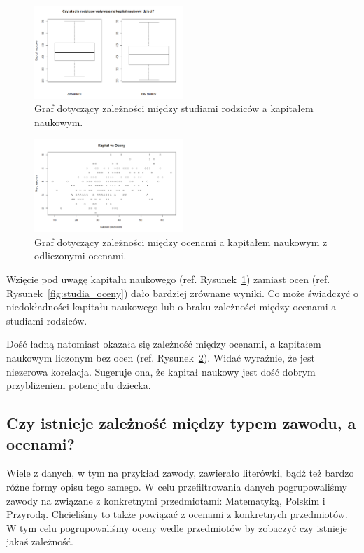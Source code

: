 \documentclass[conference]{IEEEtran}
\begin{document}
\begin{figure}
	\centering
	\includegraphics[width=0.5\textwidth]{6.png}
	\caption{Graf dotyczący zależności między studiami rodziców a kapitałem naukowym.}
	\label{fig:studia_kapital}
\end{figure}
\begin{figure}
	\centering
	\includegraphics[width=0.5\textwidth]{7.png}
	\caption{Graf dotyczący zależności między ocenami a kapitałem naukowym z odliczonymi ocenami.}
	\label{fig:oceny_kapital}
\end{figure}

Wzięcie pod uwagę kapitału naukowego (ref. Rysunek~\ref{fig:studia_kapital}) zamiast ocen (ref. Rysunek~\ref{fig:studia_oceny}) dało bardziej zrównane wyniki. Co może świadczyć o niedokładności kapitału naukowego lub o braku zależności między ocenami a studiami rodziców.

Dość ładną natomiast okazała się zależność między ocenami, a kapitałem naukowym liczonym bez ocen (ref. Rysunek~\ref{fig:oceny_kapital}). Widać wyraźnie, że jest niezerowa korelacja. Sugeruje ona, że kapitał naukowy jest dość dobrym przybliżeniem potencjału dziecka.

\subsection{Czy istnieje zależność między typem zawodu, a ocenami?}
Wiele z danych, w tym na przykład zawody, zawierało literówki, bądź też bardzo różne formy opisu tego samego. W celu przefiltrowania danych pogrupowaliśmy zawody na związane z konkretnymi przedmiotami: Matematyką, Polskim i Przyrodą.
Chcieliśmy to także powiązać z ocenami z konkretnych przedmiotów. W tym celu pogrupowaliśmy oceny wedle przedmiotów by zobaczyć czy istnieje jakaś zależność.
\end{document}
